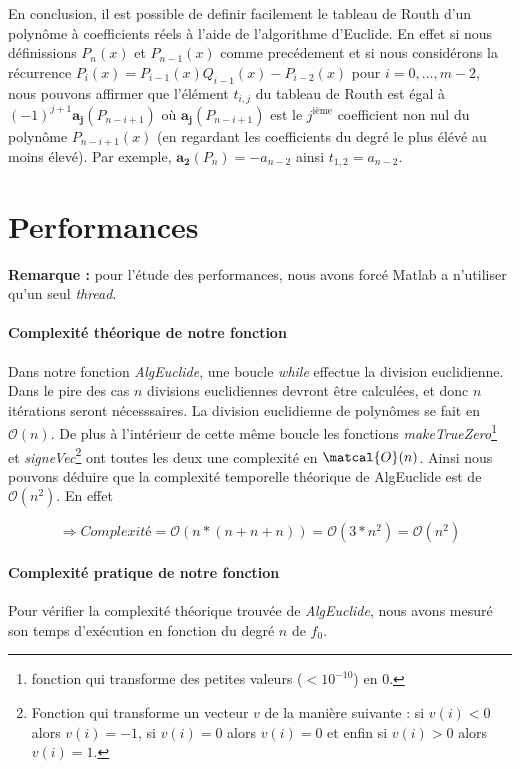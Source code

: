 \documentclass[11pt]{article}
\begin{document}
En conclusion, il est possible de definir facilement le tableau de Routh d'un polynôme à coefficients
réels à l'aide de l'algorithme d'Euclide. En effet si nous définissions $P_n (x)$ et $P_{n-1} (x)$ comme precédement
 et si nous considérons la récurrence $P_i (x) = P_{i-1}(x) Q_{i-1}(x) - P_{i-2}(x)$ pour $i=0,\dots,m-2$, nous pouvons affirmer que l'élément $t_{i,j}$ du tableau
 de Routh est égal à $(-1)^{j+1} \mathbf{a_j}(P_{n-i+1})$ où $\mathbf{a_j}(P_{n-i+1})$ est le $j^{\text{ième}}$ coefficient non nul du polynôme $P_{n-i+1}(x)$ (en regardant les coefficients du degré le plus élévé au moins élevé).
 Par exemple, $\mathbf{a_2}(P_{n}) = -a_{n-2}$ ainsi $t_{1,2} = a_{n-2}$.

\clearpage

\section*{Performances}

\textbf{Remarque :} pour l'étude des performances, nous avons forcé Matlab a n'utiliser qu'un seul \textit{thread}.

\paragraph{Complexité théorique de notre fonction} Dans notre fonction \textit{AlgEuclide}, une boucle \textit{while} effectue la division euclidienne. Dans le pire des cas $n$ divisions euclidiennes
    devront être calculées, et donc $n$ itérations seront nécesssaires. La division euclidienne de polynômes se fait en $\mathcal{O}(n)$.
    De plus à l'intérieur de cette même boucle les fonctions \textit{makeTrueZero}\footnote{fonction qui transforme des petites valeurs ($<10^{-10}$) en 0.} et \textit{signeVec}\footnote{Fonction qui transforme un vecteur $v$ de la manière suivante : si $v(i)<0$ alors $v(i)=-1$, si $v(i)=0$ alors $v(i)=0$ et enfin si $v(i)>0$ alors $v(i)=1$.} ont toutes les deux une complexité en $\matcal{O}(n)$.
     Ainsi nous pouvons déduire que la complexité temporelle théorique de AlgEuclide est de $\mathcal{O}(n^2)$. En effet

    $$\Rightarrow Complexité = \mathcal{O}(n*(n+n+n)) = \mathcal{O}(3*n^2) = \mathcal{O}(n^2) $$

\paragraph{Complexité pratique de notre fonction}
    Pour vérifier la complexité théorique trouvée de \textit{AlgEuclide}, nous avons mesuré son temps d'exécution en fonction du degré $n$ de $f_0$.
\end{document}
